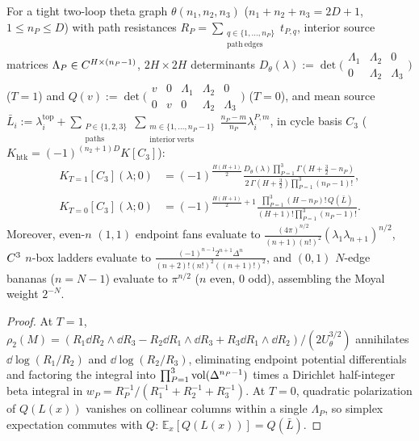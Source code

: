 \begin{theorem}
\label{thm:theta-closed}
For a tight two-loop theta graph $\theta(n_1,n_2,n_3)$ ($n_1+n_2+n_3 = 2D+1$, $1 \le n_P \le D$) with path resistances $R_P = \sum_{\substack{q\in\{1,\dots,n_P\}\\\mathrm{path\ edges}}}t_{P,q}$, interior source matrices $\Lambda_P \in C^{H\times(n_P-1)}$, $2H\times 2H$ determinants $D_\theta(\lambda) := \det\bigl(\begin{smallmatrix}\Lambda_1 & \Lambda_2 & 0\\ 0 & \Lambda_2 & \Lambda_3\end{smallmatrix}\bigr)$ ($T=1$) and $Q(v) := \det\bigl(\begin{smallmatrix}v & 0 & \Lambda_1 & \Lambda_2 & 0\\ 0 & v & 0 & \Lambda_2 & \Lambda_3\end{smallmatrix}\bigr)$ ($T=0$), and mean source $\bar{L}_i := \lambda^{\mathrm{top}}_i + \sum_{\substack{P\in\{1,2,3\}\\\mathrm{paths}}}\sum_{\substack{m\in\{1,\dots,n_P-1\}\\\mathrm{interior\ verts}}}\frac{n_P-m}{n_P}\lambda^{P,m}_i$, in cycle basis $C_3$ ($K_{\mathrm{htk}} = (-1)^{(n_2+1)D}K[C_3]$):
\begin{equation}
\label{eq:theta-closed-both}
\begin{aligned}
K_{T=1}[C_3](\lambda;0) &= (-1)^{\frac{H(H+1)}{2}}\frac{D_\theta(\lambda)\prod_{P=1}^3\Gamma(H+\frac{3}{2}-n_P)}{2\,\Gamma(H+\frac{3}{2})\prod_{P=1}^3(n_P-1)!},\\
K_{T=0}[C_3](\lambda;0) &= (-1)^{\frac{H(H+1)}{2}+1}\frac{\prod_{P=1}^3(H-n_P)!\,Q(\bar{L})}{(H+1)!\prod_{P=1}^3(n_P-1)!}.
\end{aligned}
\end{equation}
Moreover, even-$n$ $(1,1)$ endpoint fans evaluate to $\frac{(4\pi)^{n/2}}{(n+1)(n!)^2}(\lambda_1\lambda_{n+1})^{n/2}$, $C^3$ $n$-box ladders evaluate to $\frac{(-1)^{n-1}2^{n+1}\Delta^n}{(n+2)!(n!)^2((n+1)!)^2}$, and $(0,1)$ $N$-edge bananas ($n=N-1$) evaluate to $\pi^{n/2}$ ($n$ even, $0$ odd), assembling the Moyal weight $2^{-N}$.
\end{theorem}

\begin{proof}
At $T=1$, $\rho_2(M) = (R_1\dd R_2\wedge\dd R_3 - R_2\dd R_1\wedge\dd R_3 + R_3\dd R_1\wedge\dd R_2)/(2U_\theta^{3/2})$ annihilates $\dd\log(R_1/R_2)$ and $\dd\log(R_2/R_3)$, eliminating endpoint potential differentials and factoring the integral into $\prod_{P=1}^3\operatorname{vol}(\Delta^{n_P-1})$ times a Dirichlet half-integer beta integral in $w_P = R_P^{-1}/(R_1^{-1}+R_2^{-1}+R_3^{-1})$. At $T=0$, quadratic polarization of $Q(L(x))$ vanishes on collinear columns within a single $\Lambda_P$, so simplex expectation commutes with $Q$: $\mathbb{E}_x[Q(L(x))] = Q(\bar{L})$.
\end{proof}

